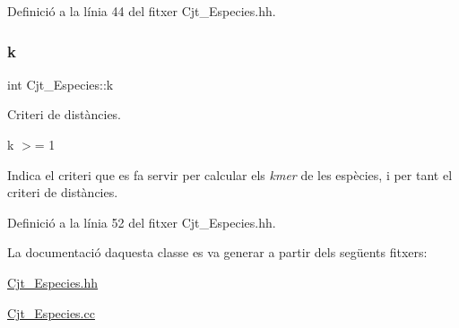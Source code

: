 Definició a la línia 44 del fitxer Cjt\+\_\+\+Especies.\+hh.

\mbox{\label{class_cjt___especies_a4586fb4724b7af4b7f00bb0c0bdd6a17}} 
\subsubsection{\texorpdfstring{k}{k}}
{\footnotesize\ttfamily int Cjt\+\_\+\+Especies\+::k\hspace{0.3cm}{\ttfamily [private]}}



Criteri de distàncies. 

k $>$= 1

Indica el criteri que es fa servir per calcular els {\itshape kmer} de les espècies, i per tant el criteri de distàncies. 

Definició a la línia 52 del fitxer Cjt\+\_\+\+Especies.\+hh.



La documentació d\textquotesingle{}aquesta classe es va generar a partir dels següents fitxers\+:\begin{DoxyCompactItemize}
\item 
\hyperlink{_cjt___especies_8hh}{Cjt\+\_\+\+Especies.\+hh}\item 
\hyperlink{_cjt___especies_8cc}{Cjt\+\_\+\+Especies.\+cc}\end{DoxyCompactItemize}
